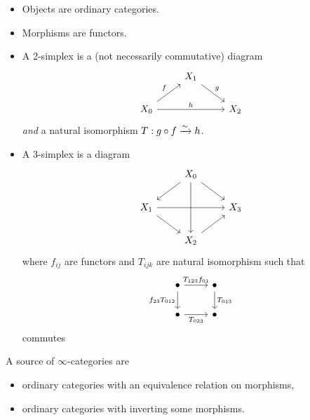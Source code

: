 \begin{example}
\begin{enumerate}[1)]
			\begin{itemize}
				\item Objects are ordinary categories.
				\item Morphisms are functors. 
				\item A 2-simplex is a (not necessarily commutative) diagram
					\[
					\begin{tikzcd}
						& X_1 \ar[dr,"g"] \\
						X_0 \ar[ur,"f"] \ar[rr,"h"] & & X_2
					\end{tikzcd}
					\] 
					\emph{and} a natural isomorphism $T:g\circ f \xrightarrow{\sim} h$.
				\item A 3-simplex is a diagram
					\[
					\begin{tikzcd}
						& X_0 \ar[dl] \ar[dr] \ar[dd] \\
						X_1 \ar[rr] \ar[dr] & & X_3 \\
								    & X_2 \ar[ur]
					\end{tikzcd}
					\]
					where $f_{ij}$ are functors and $T_{ijk}$ are natural isomorphism such that
					\[
					\begin{tikzcd}
						\bullet \ar[r,"T_{123}f_{01}"] \ar[d,"f_{23}T_{012}"'] & \bullet \ar[d,"T_{013}"] \\
						\bullet \ar[r,"T_{023}"'] & \bullet
					\end{tikzcd}
					\] 
					commutes
			\end{itemize}
	\end{enumerate}
\end{example}
A source of $\infty$-categories are
\begin{itemize}
	\item ordinary categories with an equivalence relation on morphisms,
	\item ordinary categories with inverting some morphisms.
\end{itemize}


